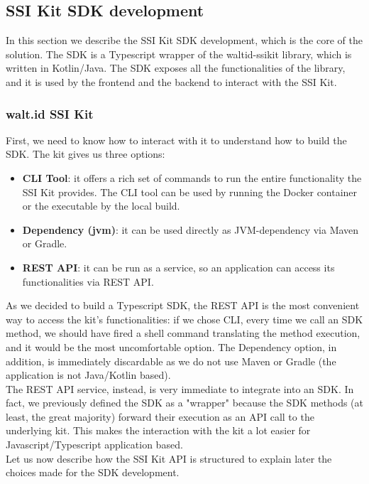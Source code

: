 \subsection{SSI Kit SDK development}
In this section we describe the SSI Kit SDK development, which is the core of the
solution. The SDK is a Typescript wrapper of the waltid-ssikit library, which is
written in Kotlin/Java. The SDK exposes all the functionalities of the library,
and it is used by the frontend and the backend to interact with the SSI Kit.

\subsubsection{walt.id SSI Kit}
First, we need to know how to interact with it to understand how to build the SDK.
The kit gives us three options:
\begin{itemize}
    \item \textbf{CLI Tool}: it offers a rich set of commands to run the entire functionality 
    the SSI Kit provides. The CLI tool can be used by running the Docker container or
    the executable by the local build.
    \item \textbf{Dependency (\acrshort{jvm})}: it can be used directly as JVM-dependency via Maven or 
    Gradle.
    \item \textbf{REST API}: it can be run as a service, so an application can access its 
    functionalities via REST API.
\end{itemize}
As we decided to build a Typescript SDK, the REST API is the most convenient way 
to access the kit's functionalities: if we chose CLI, every time we call an SDK 
method,  we should have fired a shell command translating the method execution, and 
it would be the most uncomfortable option. The Dependency option, in addition, is 
immediately discardable as we do not use Maven or Gradle (the application is not 
Java/Kotlin based).\\
The REST API service, instead, is very immediate to integrate into an SDK.
In fact, we previously defined the SDK as a "wrapper" because the SDK methods (at 
least, the great majority) forward their execution as an API call to the underlying 
kit. This makes the interaction with the kit a lot easier for Javascript/Typescript 
application based.
\vspace*{0.3cm}\\
Let us now describe how the SSI Kit API is structured to explain later the choices 
made for the SDK development.
